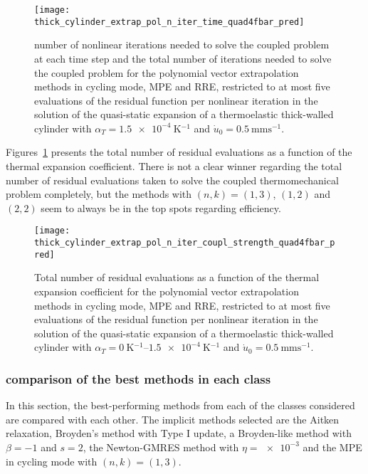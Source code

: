 \begin{figure}[htbp]
 \centering
 \texttt{[image: thick\_cylinder\_extrap\_pol\_n\_iter\_time\_quad4fbar\_pred]}
 \caption{number of nonlinear iterations needed to solve the coupled problem at each time step and the total number of iterations needed to solve the coupled problem for the polynomial vector extrapolation methods in cycling mode, MPE and RRE, restricted to at most five evaluations of the residual function per nonlinear iteration in the solution of the quasi-static expansion of a thermoelastic thick-walled cylinder with \(\alpha_T=\SI{1.5e-4}{\kelvin^{-1}}\) and \(\dot u_0 =\SI{0.5}{\milli\meter\second^{-1}}\).}
\label{fig:thick_cylinder_extrap_pol_n_iter_time_quad4fbar_pred}
\end{figure}

Figures~\ref{fig:thick_cylinder_extrap_pol_n_iter_time_quad4fbar_pred} presents the total number of residual evaluations as a function of the thermal expansion coefficient.
There is not a clear winner regarding the total number of residual evaluations taken to solve the coupled thermomechanical problem completely, but the methods with \((n,k)=(1,3)\), \((1,2)\) and \((2,2)\) seem to always be in the top spots regarding efficiency.

\begin{figure}[htbp]
 \centering
 \texttt{[image: thick\_cylinder\_extrap\_pol\_n\_iter\_coupl\_strength\_quad4fbar\_pred]}
 \caption{Total number of residual evaluations as a function of the thermal expansion coefficient for the polynomial vector extrapolation methods in cycling mode, MPE and RRE, restricted to at most five evaluations of the residual function per nonlinear iteration in the solution of the quasi-static expansion of a thermoelastic thick-walled cylinder with \(\alpha_T=\SIrange{0}{1.5e-4}{\kelvin^{-1}}\) and \(\dot u_0 =\SI{0.5}{\milli\meter\second^{-1}}\).}
\label{fig:thick_cylinder_extrap_pol_n_iter_coupl_strength_quad4fbar_pred}
\end{figure}

\FloatBarrier

\subsubsection{comparison of the best methods in each class}

In this section, the best-performing methods from each of the classes considered are compared with each other.
The implicit methods selected are the Aitken relaxation, Broyden's method with Type I update, a Broyden-like method with \(\beta=-1\) and \(s=2\), the Newton-GMRES method with \(\eta=\num{e-3}\) and the MPE in cycling mode with \((n,k)=(1,3)\).

